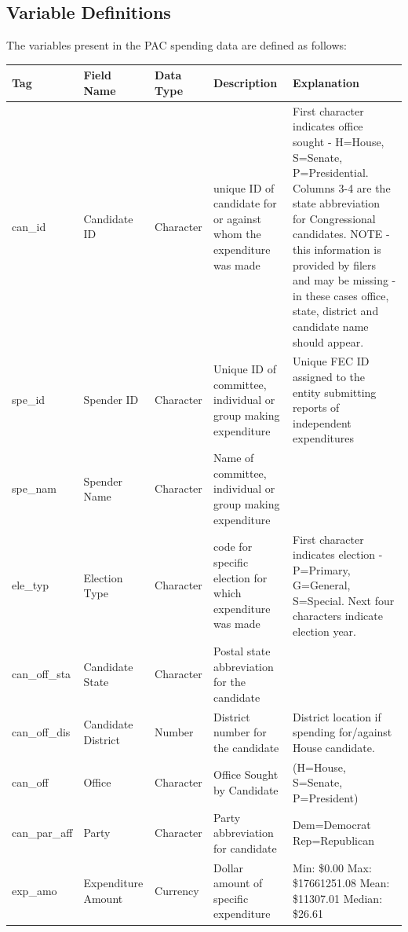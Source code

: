 \documentclass[11pt]{article}\usepackage{graphicx, color}
\begin{document}
\subsection{Variable Definitions}
The variables present in the PAC spending data are defined as follows:
\begin{landscape}
\begin{center}
\begin{longtable}[\textwidth]{l l l p{0.4\textheight} p{0.4\textheight}}
Tag & Field Name    & Data Type	& Description	& Explanation \\
\hline
can\_id  & Candidate ID  & Character &unique ID of candidate for or against whom the expenditure was made	& First character indicates office sought - H=House, S=Senate, P=Presidential. Columns 3-4 are the state abbreviation for Congressional candidates. NOTE - this information is provided by filers and may be missing - in these cases office, state, district and candidate name should appear. \\
spe\_id & Spender ID & Character & Unique ID of committee, individual or group making expenditure	&	Unique FEC ID assigned to the entity submitting reports of independent expenditures \\
spe\_nam & Spender Name &	Character &	Name of committee, individual or group making expenditure	& \\
ele\_typ & Election Type & Character & code for specific election for which expenditure was made & First character indicates election - P=Primary, G=General, S=Special. Next four characters indicate election year. \\
can\_off\_sta & Candidate State	& Character	& Postal state abbreviation for the candidate	& \\	 
can\_off\_dis &	Candidate District & Number &	District number for the candidate	&	District location if spending for/against House candidate.\\
can\_off & Office &	Character &	Office Sought by Candidate &	(H=House, S=Senate, P=President)\\
can\_par\_aff &	Party	& Character &	Party abbreviation for candidate & Dem=Democrat \newline Rep=Republican \\
exp\_amo & Expenditure Amount &	Currency & Dollar amount of specific expenditure & 
Min: \$0.00 \newline
Max: \$17661251.08 \newline
Mean: \$11307.01 \newline
Median: \$26.61\\

\end{longtable}
\end{center}
\end{landscape}
\end{document}
